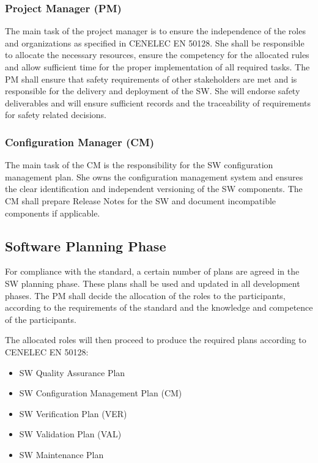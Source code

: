 \subsubsection{Project Manager (PM)}
\label{sec:project-manager}

The main task of the project manager is to ensure the independence of the roles
and organizations as specified in CENELEC EN 50128. She shall be responsible to
allocate the necessary resources, ensure the competency for the allocated rules
and allow sufficient time for the proper implementation of all required
tasks. The PM shall ensure that safety requirements of other stakeholders are
met and is responsible for the delivery and deployment of the SW. She will
endorse safety deliverables and will ensure sufficient records and the
traceability of requirements for safety related decisions.

\subsubsection{Configuration Manager (CM)}
\label{sec:conf-manag}

The main task of the CM is the responsibility for the SW configuration
management plan. She owns the configuration management system and ensures the
clear identification and independent versioning of the SW components. The CM
shall prepare Release Notes for the SW and document incompatible components if
applicable.

\subsection{Software Planning Phase}
\label{sec:documents--plan}

For compliance with the standard, a certain number of plans are agreed in the SW
planning phase. These plans shall be used and updated in all development
phases. The PM shall decide the allocation of the roles to the participants,
according to the requirements of the standard and the knowledge and competence
of the participants.

The allocated roles will then proceed to produce the required plans according to
CENELEC EN 50128:

\begin{itemize}
\item SW Quality Assurance Plan
\item SW Configuration Management Plan (CM)
\item SW Verification Plan (VER)
\item SW Validation Plan (VAL)
\item SW Maintenance Plan
\end{itemize}



